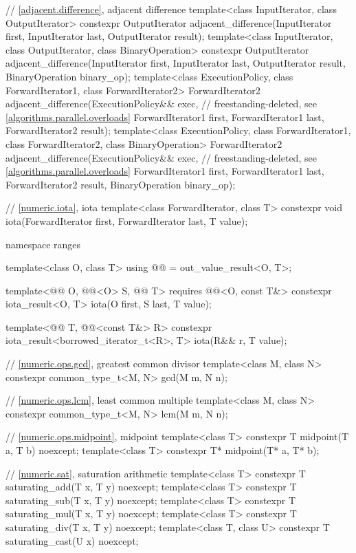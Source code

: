\begin{codeblock}
{  // \ref{adjacent.difference}, adjacent difference
  template<class InputIterator, class OutputIterator>
    constexpr OutputIterator
      adjacent_difference(InputIterator first, InputIterator last,
                          OutputIterator result);
  template<class InputIterator, class OutputIterator, class BinaryOperation>
    constexpr OutputIterator
      adjacent_difference(InputIterator first, InputIterator last,
                          OutputIterator result, BinaryOperation binary_op);
  template<class ExecutionPolicy, class ForwardIterator1, class ForwardIterator2>
    ForwardIterator2
      adjacent_difference(ExecutionPolicy&& exec,               // freestanding-deleted, see \ref{algorithms.parallel.overloads}
                          ForwardIterator1 first, ForwardIterator1 last,
                          ForwardIterator2 result);
  template<class ExecutionPolicy, class ForwardIterator1, class ForwardIterator2,
           class BinaryOperation>
    ForwardIterator2
      adjacent_difference(ExecutionPolicy&& exec,               // freestanding-deleted, see \ref{algorithms.parallel.overloads}
                          ForwardIterator1 first, ForwardIterator1 last,
                          ForwardIterator2 result, BinaryOperation binary_op);

  // \ref{numeric.iota}, iota
  template<class ForwardIterator, class T>
    constexpr void iota(ForwardIterator first, ForwardIterator last, T value);

  namespace ranges {
    template<class O, class T>
      using @@ = out_value_result<O, T>;

    template<@@ O, @@<O> S, @@ T>
      requires @@<O, const T&>
      constexpr iota_result<O, T> iota(O first, S last, T value);

    template<@@ T, @@<const T&> R>
      constexpr iota_result<borrowed_iterator_t<R>, T> iota(R&& r, T value);
  }

  // \ref{numeric.ops.gcd}, greatest common divisor
  template<class M, class N>
    constexpr common_type_t<M, N> gcd(M m, N n);

  // \ref{numeric.ops.lcm}, least common multiple
  template<class M, class N>
    constexpr common_type_t<M, N> lcm(M m, N n);

  // \ref{numeric.ops.midpoint}, midpoint
  template<class T>
    constexpr T midpoint(T a, T b) noexcept;
  template<class T>
    constexpr T* midpoint(T* a, T* b);

  // \ref{numeric.sat}, saturation arithmetic
  template<class T>
    constexpr T saturating_add(T x, T y) noexcept;
  template<class T>
    constexpr T saturating_sub(T x, T y) noexcept;
  template<class T>
    constexpr T saturating_mul(T x, T y) noexcept;
  template<class T>
    constexpr T saturating_div(T x, T y) noexcept;
  template<class T, class U>
    constexpr T saturating_cast(U x) noexcept;
}
\end{codeblock}

